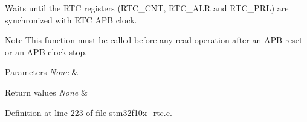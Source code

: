 Waits until the R\+TC registers (R\+T\+C\+\_\+\+C\+NT, R\+T\+C\+\_\+\+A\+LR and R\+T\+C\+\_\+\+P\+RL) are synchronized with R\+TC A\+PB clock. 

\begin{DoxyNote}{Note}
This function must be called before any read operation after an A\+PB reset or an A\+PB clock stop. 
\end{DoxyNote}

\begin{DoxyParams}{Parameters}
{\em None} & \\
\hline
\end{DoxyParams}

\begin{DoxyRetVals}{Return values}
{\em None} & \\
\hline
\end{DoxyRetVals}


Definition at line 223 of file stm32f10x\+\_\+rtc.\+c.

